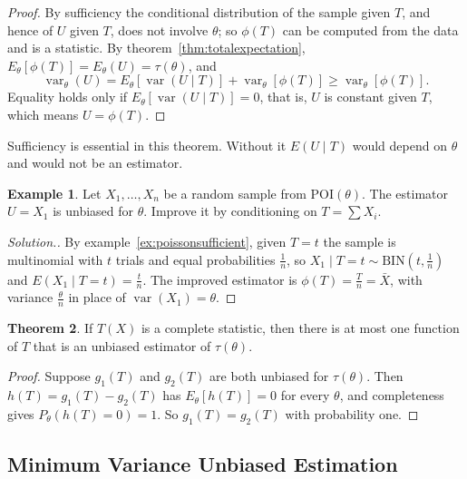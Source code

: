 \documentclass[12pt,a4paper]{report}
\theoremstyle{definition}
\newtheorem{thm}{Theorem}[section]
\newtheorem{exa}[thm]{Example}
\DeclareMathOperator{\var}{var}
\newenvironment{solution}
  {\renewcommand{\qedsymbol}{}\begin{proof}[\textit{Solution}.]}
  {\end{proof}}
\begin{document}
\begin{proof}
By sufficiency the conditional distribution of the sample given $T$, and hence of
$U$ given $T$, does not involve $\theta$; so $\phi(T)$ can be computed from the data
and is a statistic. By theorem~\ref{thm:totalexpectation},
$E_\theta\left[\phi(T)\right] = E_\theta(U) = \tau(\theta)$, and
\[\var_\theta(U) = E_\theta\left[\var(U\mid T)\right] + \var_\theta\left[\phi(T)\right]
\ge\var_\theta\left[\phi(T)\right] .\]
Equality holds only if $E_\theta\left[\var(U\mid T)\right] = 0$, that is, $U$ is
constant given $T$, which means $U = \phi(T)$.
\end{proof}

Sufficiency is essential in this theorem. Without it $E(U\mid T)$ would depend on
$\theta$ and would not be an estimator.

\begin{exa}
\label{ex:raoblackwellpoisson}
Let $X_1, \dots, X_n$ be a random sample from $\text{POI}(\theta)$. The estimator
$U = X_1$ is unbiased for $\theta$. Improve it by conditioning on $T = \sum X_i$.
\end{exa}

\begin{solution}
By example~\ref{ex:poissonsufficient}, given $T = t$ the sample is multinomial
with $t$ trials and equal probabilities $\frac1n$, so $X_1\mid T = t\sim
\text{BIN}\left(t, \frac1n\right)$ and $E(X_1\mid T = t) = \frac tn$. The improved
estimator is $\phi(T) = \frac Tn = \bar X$, with variance $\frac\theta n$ in place of
$\var(X_1) = \theta$.
\end{solution}

\begin{thm}
\label{thm:uniqueunbiased}
If $T(X)$ is a complete statistic, then there is at most one function of $T$
that is an unbiased estimator of $\tau(\theta)$.
\end{thm}

\begin{proof}
Suppose $g_1(T)$ and $g_2(T)$ are both unbiased for $\tau(\theta)$. Then
$h(T) = g_1(T) - g_2(T)$ has $E_\theta\left[h(T)\right] = 0$ for every $\theta$, and
completeness gives $P_\theta(h(T) = 0) = 1$. So $g_1(T) = g_2(T)$ with probability
one.
\end{proof}

\subsection{Minimum Variance Unbiased Estimation}
\end{document}
